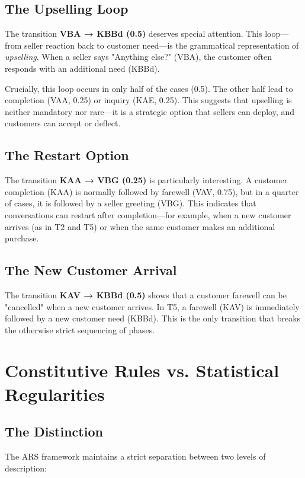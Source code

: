 \documentclass[12pt,a4paper]{article}
\begin{document}
\subsection{The Upselling Loop}

The transition \textbf{VBA → KBBd (0.5)} deserves special attention. This
loop—from seller reaction back to customer need—is the grammatical
representation of \textit{upselling}. When a seller says "Anything else?"
(VBA), the customer often responds with an additional need (KBBd).

Crucially, this loop occurs in only half of the cases (0.5). The other half
lead to completion (VAA, 0.25) or inquiry (KAE, 0.25). This suggests that
upselling is neither mandatory nor rare—it is a strategic option that sellers
can deploy, and customers can accept or deflect.

\subsection{The Restart Option}

The transition \textbf{KAA → VBG (0.25)} is particularly interesting.
A customer completion (KAA) is normally followed by farewell (VAV, 0.75),
but in a quarter of cases, it is followed by a seller greeting (VBG).
This indicates that conversations can restart after completion—for example,
when a new customer arrives (as in T2 and T5) or when the same customer
makes an additional purchase.

\subsection{The New Customer Arrival}

The transition \textbf{KAV → KBBd (0.5)} shows that a customer farewell
can be "cancelled" when a new customer arrives. In T5, a farewell (KAV)
is immediately followed by a new customer need (KBBd). This is the only
transition that breaks the otherwise strict sequencing of phases.

\section{Constitutive Rules vs. Statistical Regularities}

\subsection{The Distinction}

The ARS framework maintains a strict separation between two levels of
description:
\end{document}
